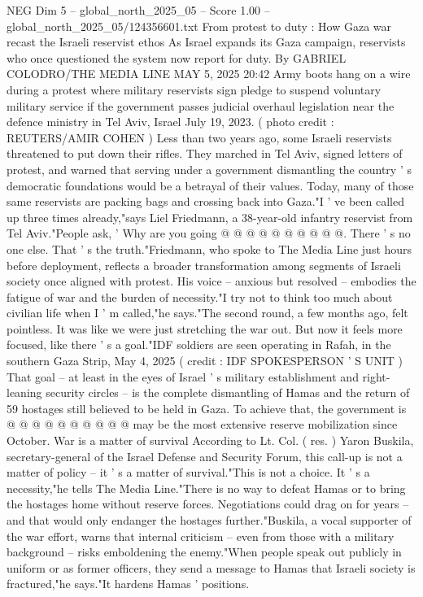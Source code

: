 \begin{textsample}{NEG Dim 5 – global\_north\_2025\_05 – Score 1.00 – global\_north\_2025\_05/124356601.txt}  \label{ex:f5_neg_380}
From protest to duty : How Gaza war recast the Israeli reservist ethos As Israel expands its Gaza campaign, reservists who once questioned the system now report for duty.
By GABRIEL COLODRO/THE MEDIA LINE MAY 5, 2025 20:42 Army boots hang on a wire during a protest where military reservists sign pledge to suspend voluntary military service if the government passes judicial overhaul legislation near the defence ministry in Tel Aviv, Israel July 19, 2023. ( photo credit : REUTERS/AMIR COHEN ) Less than two years ago, some Israeli reservists threatened to put down their rifles.
They marched in Tel Aviv, signed letters of protest, and warned that serving under a government dismantling the country ' s democratic foundations would be a betrayal of their values.
Today, many of those same reservists are packing bags and crossing back into Gaza."I ' ve been called up three times already,"says Liel Friedmann, a 38-year-old infantry reservist from Tel Aviv."People ask, ' Why are you going @ @ @ @ @ @ @ @ @ @.
There ' s no one else.
That ' s the truth."Friedmann, who spoke to The Media Line just hours before deployment, reflects a broader transformation among segments of Israeli society once aligned with protest.
His voice -- anxious but resolved -- embodies the fatigue of war and the burden of necessity."I try not to think too much about civilian life when I ' m called,"he says."The second round, a few months ago, felt pointless.
It was like we were just stretching the war out.
But now it feels more focused, like there ' s a goal."IDF soldiers are seen operating in Rafah, in the southern Gaza Strip, May 4, 2025 ( credit : IDF SPOKESPERSON ' S UNIT ) That goal -- at least in the eyes of Israel ' s military establishment and right-leaning security circles -- is the complete dismantling of Hamas and the return of 59 hostages still believed to be held in Gaza.
To achieve that, the government is @ @ @ @ @ @ @ @ @ @ may be the most extensive reserve mobilization since October.
War is a matter of survival According to Lt.
Col. ( res. ) Yaron Buskila, secretary-general of the Israel Defense and Security Forum, this call-up is not a matter of policy -- it ' s a matter of survival."This is not a choice.
It ' s a necessity,"he tells The Media Line."There is no way to defeat Hamas or to bring the hostages home without reserve forces.
Negotiations could drag on for years -- and that would only endanger the hostages further."Buskila, a vocal supporter of the war effort, warns that internal criticism -- even from those with a military background -- risks emboldening the enemy."When people speak out publicly in uniform or as former officers, they send a message to Hamas that Israeli society is fractured,"he says."It hardens Hamas ' positions.

\end{textsample}
